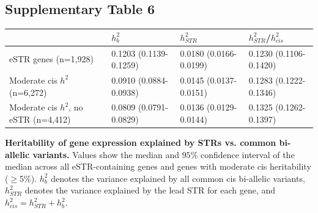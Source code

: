 \pagebreak
\subsection{Supplementary Table 6}
\label{tab:estrsuptab6}
\begin{table}[h!]
\begin{adjustbox}{width=1\textwidth}
\begin{tabular}{l|l|l|l}
 & $h^2_b$ & $h^2_{STR}$ & $h^2_{STR}$/$h^2_{cis}$ \\
\hline
eSTR genes (n=1,928)         &	0.1203 (0.1139-0.1259) &	0.0180 (0.0166-0.0199)	& 0.1230 (0.1106-0.1420)\\\hline
Moderate cis $h^2$ (n=6,272) &	0.0910 (0.0884-0.0938) &	0.0145 (0.0137-0.0151)	& 0.1283 (0.1222-0.1346)\\\hline
Moderate cis $h^2$, no eSTR (n=4,412) & 0.0809 (0.0791-0.0829) & 0.0136 (0.0129-0.0144) & 0.1325 (0.1262-0.1397) \\\hline
\end{tabular}
\end{adjustbox}
\end{table}
\textbf{Heritability of gene expression explained by STRs vs. common bi-allelic variants.} Values show the median and $95\%$ confidence interval of the median across all eSTR-containing genes and genes with moderate cis heritability ($\geq$5\%). $h^2_b$ denotes the variance explained by all common cis bi-allelic variants, $h^2_{STR}$ denotes the variance explained by the lead STR for each gene, and $h^2_{cis} = h^2_{STR} + h^2_b$.


\pagebreak
